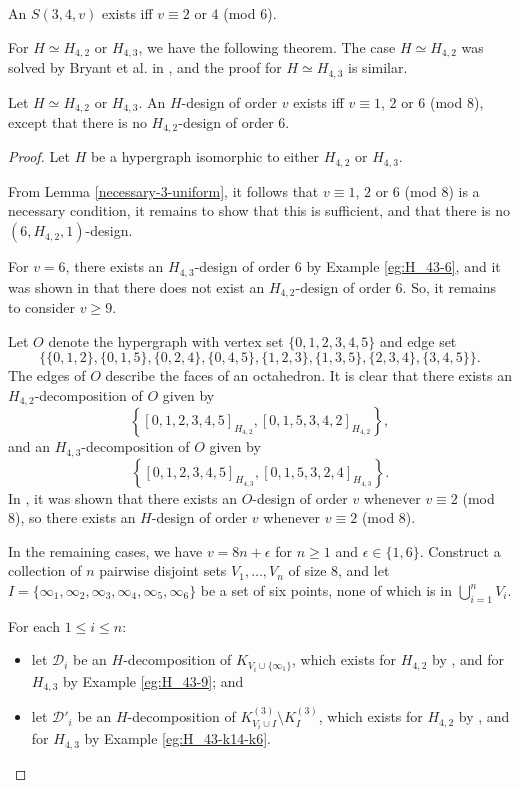 \begin{theorem} \label{thm:K4^3}
An $S(3, 4, v)$ exists iff $v \equiv 2$ or $4$ (mod $6$).
\end{theorem}


For $H \simeq H_{4,2}$ or $H_{4,3}$, we have the following theorem.
The case $H \simeq H_{4,2}$ was solved by Bryant et al. in \cite{bryant}, and the proof for $H \simeq H_{4,3}$ is similar.

\begin{theorem} \label{thm:H_42,H_43}
Let $H \simeq H_{4,2}$ or $H_{4,3}$.
An $H$-design of order $v$ exists iff $v \equiv 1$, $2$ or $6$ (mod $8$),
  except that there is no $H_{4,2}$-design of order $6$.
\end{theorem}

\begin{proof}
Let $H$ be a hypergraph isomorphic to either $H_{4,2}$ or $H_{4,3}$.

From Lemma \ref{necessary-3-uniform}, it follows that $v \equiv 1$, $2$ or $6$ (mod $8$) is a necessary condition,
   it remains to show that this is sufficient, and that there is no $(6, H_{4,2}, 1)$-design.

For $v = 6$, there exists an $H_{4,3}$-design of order 6 by Example \ref{eg:H_43-6},
  and it was shown in \cite{bryant} that there does not exist an $H_{4,2}$-design of order 6. So, it remains to consider $v \geq 9$.

Let $O$ denote the hypergraph with vertex set $\{0,1,2,3,4,5\}$ and edge set
\[
    \{\{0,1,2\},\{0,1,5\},\{0,2,4\},\{0,4,5\},\{1,2,3\},\{1,3,5\},\{2,3,4\},\{3,4,5\}\}.
\]
The edges of $O$ describe the faces of an octahedron.
It is clear that there exists an $H_{4,2}$-decomposition of $O$ given by \[ \left\{ [0,1,2,3,4,5]_{H_{4,2}}, [0,1,5,3,4,2]_{H_{4,2}} \right\}, \]
  and an $H_{4,3}$-decomposition of $O$ given by \[ \left\{[0,1,2,3,4,5]_{H_{4,3}}, [0,1,5,3,2,4]_{H_{4,3}} \right\}. \]
In \cite{hanani}, it was shown that there exists an $O$-design of order $v$ whenever $v \equiv 2$ (mod 8),
  so there exists an $H$-design of order $v$ whenever $v \equiv 2$ (mod 8).


In the remaining cases, we have $v = 8n + \epsilon$ for $n \geq 1$ and $\epsilon \in \{1,6\}$.
Construct a collection of $n$ pairwise disjoint sets $V_1, \ldots, V_n$ of size 8,
  and let $I = \{\infty_1, \infty_2, \infty_3, \infty_4, \infty_5, \infty_6\}$ be a set of six points, none of which is in $\bigcup_{i=1}^{n} V_i$.

For each $1 \leq i \leq n$:
\begin{itemize}
  \item let $\mathcal{D}_i$ be an $H$-decomposition of $K_{V_i \cup \{\infty_1\}}$, which exists for $H_{4,2}$ by \cite{bryant}, and for $H_{4,3}$ by Example \ref{eg:H_43-9}; and
  \item let $\mathcal{D}'_i$ be an $H$-decomposition of $K_{V_i \cup I}^{(3)} \setminus K_{I}^{(3)}$, which exists for $H_{4,2}$ by \cite{bryant}, and for $H_{4,3}$ by Example \ref{eg:H_43-k14-k6}.
\end{itemize}


\end{proof}
